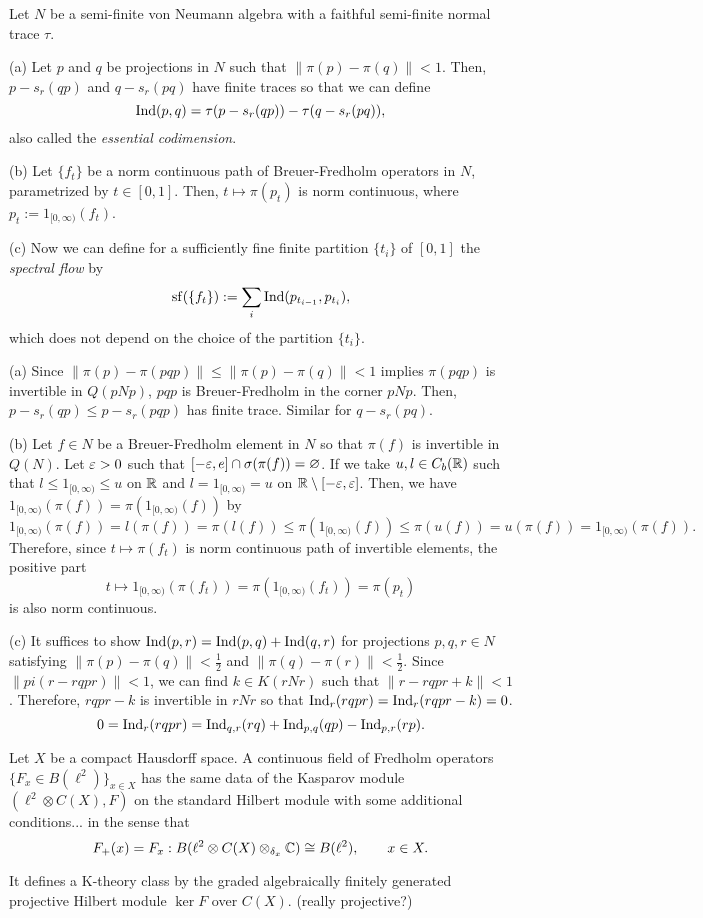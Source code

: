 \documentclass{../../large}
\renewcommand{\sf}{\operatorname{sf}}
\begin{document}
\begin{prb}
Let $N$ be a semi-finite von Neumann algebra with a faithful semi-finite normal trace $\tau$.

(a)
Let $p$ and $q$ be projections in $N$ such that $\|\pi(p)-\pi(q)\|<1$.
Then, $p-s_r(qp)$ and $q-s_r(pq)$ have finite traces so that we can define
\[\operatorname{Ind}(p,q)=\tau(p-s_r(qp))-\tau(q-s_r(pq)),\]
also called the \emph{essential codimension}.

(b)
Let $\{f_t\}$ be a norm continuous path of Breuer-Fredholm operators in $N$, parametrized by $t\in[0,1]$.
Then, $t\mapsto\pi(p_t)$ is norm continuous, where $p_t:=1_{[0,\infty)}(f_t)$.

(c)
Now we can define for a sufficiently fine finite partition $\{t_i\}$ of $[0,1]$ the \emph{spectral flow} by
\[\sf(\{f_t\}):=\sum_i\Ind(p_{t_{i-1}},p_{t_i}),\]
which does not depend on the choice of the partition $\{t_i\}$.
\end{prb}
\begin{pf}
(a)
Since $\|\pi(p)-\pi(pqp)\|\le\|\pi(p)-\pi(q)\|<1$ implies $\pi(pqp)$ is invertible in $Q(pNp)$, $pqp$ is Breuer-Fredholm in the corner $pNp$.
Then, $p-s_r(qp)\le p-s_r(pqp)$ has finite trace.
Similar for $q-s_r(pq)$.

(b)
Let $f\in N$ be a Breuer-Fredholm element in $N$ so that $\pi(f)$ is invertible in $Q(N)$.
Let $\varepsilon>0$ such that $[-\varepsilon,e]\cap\sigma(\pi(f))=\varnothing$.
If we take $u,l\in C_b(\mathbb{R})$ such that $l\le1_{[0,\infty)}\le u$ on $\mathbb{R}$ and $l=1_{[0,\infty)}=u$ on $\mathbb{R}\setminus[-\varepsilon,\varepsilon]$.
Then, we have $1_{[0,\infty)}(\pi(f))=\pi(1_{[0,\infty)}(f))$ by
\[1_{[0,\infty)}(\pi(f))=l(\pi(f))=\pi(l(f))\le\pi(1_{[0,\infty)}(f))\le\pi(u(f))=u(\pi(f))=1_{[0,\infty)}(\pi(f)).\]
Therefore, since $t\mapsto\pi(f_t)$ is norm continuous path of invertible elements, the positive part
\[t\mapsto1_{[0,\infty)}(\pi(f_t))=\pi(1_{[0,\infty)}(f_t))=\pi(p_t)\]
is also norm continuous.

(c)
It suffices to show $\operatorname{Ind}(p,r)=\operatorname{Ind}(p,q)+\operatorname{Ind}(q,r)$ for projections $p,q,r\in N$ satisfying $\|\pi(p)-\pi(q)\|<\frac12$ and $\|\pi(q)-\pi(r)\|<\frac12$.
Since $\|pi(r-rqpr)\|<1$, we can find $k\in K(rNr)$ such that $\|r-rqpr+k\|<1$.
Therefore, $rqpr-k$ is invertible in $rNr$ so that $\operatorname{Ind}_r(rqpr)=\operatorname{Ind}_r(rqpr-k)=0$.
\[0=\operatorname{Ind}_r(rqpr)=\operatorname{Ind}_{q,r}(rq)+\operatorname{Ind}_{p,q}(qp)-\operatorname{Ind}_{p,r}(rp).\]
\end{pf}


\begin{prb}
Let $X$ be a compact Hausdorff space.
A continuous field of Fredholm operators $\{F_x\in B(\ell^2)\}_{x\in X}$ has the same data of the Kasparov module $(\ell^2\otimes C(X),F)$ on the standard Hilbert module with some additional conditions... in the sense that
\[F_+(x)=F_x:B(\ell^2\otimes C(X)\otimes_{\delta_x}\mathbb{C})\cong B(\ell^2),\qquad x\in X.\]

It defines a K-theory class by the graded algebraically finitely generated projective Hilbert module $\ker F$ over $C(X)$. (really projective?)
\end{prb}
\end{document}
